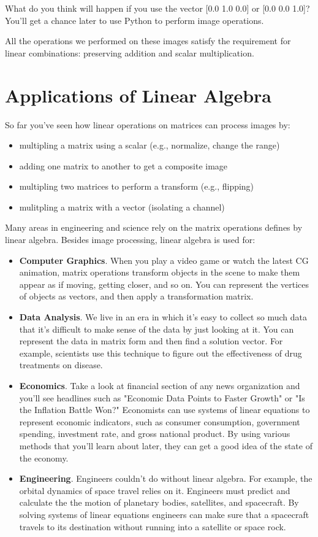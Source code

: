 What do you think will happen if you use the vector [0.0 1.0 0.0] or 
[0.0 0.0 1.0]? You'll get a chance later to use Python to perform image 
operations.

All the operations we performed on these images satisfy the requirement for 
linear combinations: preserving addition and scalar multiplication. 


\section{Applications of Linear Algebra}

So far you've seen how linear operations on matrices can process images by:
\begin{itemize}
\item multipling a matrix using a scalar (e.g., normalize, change the range)
\item adding one matrix to another to get a composite image 
\item multipling two matrices to perform a transform (e.g., flipping)
\item mulitpling a matrix with a vector (isolating a channel)
\end{itemize}

Many areas in engineering and science rely on the matrix operations defines by 
linear algebra. Besides image processing, linear algebra is used for: 
\begin{itemize}
\item \textbf{Computer Graphics}. When you play a video game or watch the latest CG 
animation, matrix operations transform objects in the scene to make them appear 
as if moving, getting closer, and so on. You can represent the vertices of 
objects as vectors, and then apply a transformation matrix.
\item \textbf{Data Analysis}. We live in an era in which it's easy to collect so much 
data that it's difficult to make sense of the data by just looking at it. You 
can represent the data in matrix form and then find a solution vector. For 
example, scientists use this technique to figure out the effectiveness of drug 
treatments on disease.
\item \textbf{Economics}. Take a look at financial section of any news organization and 
you'll see headlines such as "Economic Data Points to Faster Growth" or "Is 
the Inflation Battle Won?" Economists can use systems of linear equations to 
represent economic indicators, such as consumer consumption, government 
spending, investment rate, and gross national product. By using various methods 
that you'll learn about later, they can get a good idea of the state of the 
economy.
\item \textbf{Engineering}. Engineers couldn't do without linear algebra. For example, 
the orbital dynamics of space travel relies on it. Engineers must predict and 
calculate the the motion of planetary bodies, satellites, and spacecraft. By 
solving systems of linear equations engineers can make sure that a spacecraft 
travels to its destination without running into a satellite or space rock.
\end{itemize}


